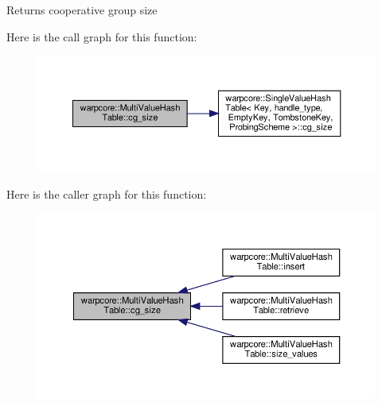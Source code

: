 \begin{DoxyReturn}{Returns}
cooperative group size 
\end{DoxyReturn}
Here is the call graph for this function\+:
\nopagebreak
\begin{figure}[H]
\begin{center}
\leavevmode
\includegraphics[width=350pt]{classwarpcore_1_1MultiValueHashTable_a2191f42810234e459bc4ef6e491ec929_cgraph}
\end{center}
\end{figure}
Here is the caller graph for this function\+:
\nopagebreak
\begin{figure}[H]
\begin{center}
\leavevmode
\includegraphics[width=350pt]{classwarpcore_1_1MultiValueHashTable_a2191f42810234e459bc4ef6e491ec929_icgraph}
\end{center}
\end{figure}
\mbox{\label{classwarpcore_1_1MultiValueHashTable_aefacf0aa968291b9965e302e835ea249}} 
